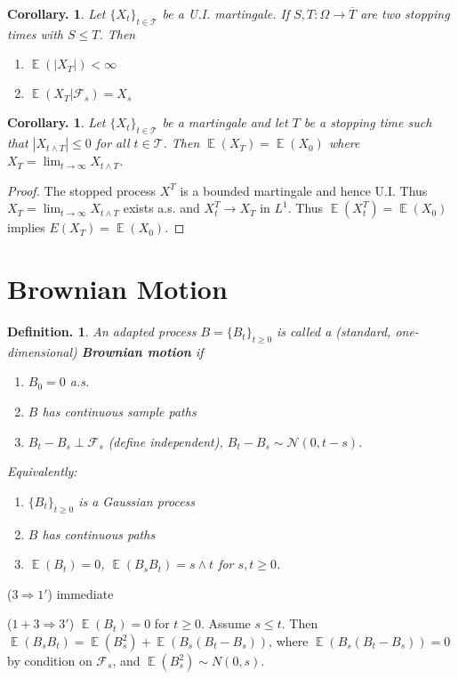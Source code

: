 \documentclass[11pt, a4paper]{memoir}
\newcommand{\imp}[2]{($#1\Rightarrow#2$)\hspace{0.2cm}}
\theoremstyle{change}
\newtheorem{corollary}[theorem]{Corollary.}
\theoremstyle{plain}
\theoremstyle{nonumberplain}
\newtheorem{definition}{Definition.}
\newtheorem{proof}{Proof}
\DeclareMathOperator{\E}{{\mathbb{E}}}
\newcommand{\defn}[1]{{\boldmath\bfseries #1}}
\numberwithin{equation}{section}
\begin{document}
\begin{corollary}
    Let $\{X_t\}_{t\in\mathcal{T}}$ be a U.I. martingale.
    If $S,T:\Omega\to\overline{T}$ are two stopping times with $S\leq T$.
    Then
    \begin{enumerate}[nl,r]
        \item $\E(|X_T|)<\infty$
        \item $\E(X_T|\mathcal{F}_s)=X_s$
    \end{enumerate}
\end{corollary}
\begin{corollary}
    Let $\{X_t\}_{t\in\mathcal{T}}$ be a martingale and let $T$ be a stopping time such that $|X_{t\wedge T}|\leq 0$ for all $t\in\mathcal{T}$.
    Then $\E(X_T)=\E(X_0)$ where $X_T=\lim_{t\to\infty}X_{t\wedge T}$.
\end{corollary}
\begin{proof}
    The stopped process $X^T$ is a bounded martingale and hence U.I.
    Thus $X_T=\lim_{t\to\infty}X_{t\wedge T}$ exists a.s. and $X_t^T\to X_T$ in $L^1$.
    Thus $\E(X^T_t)=\E(X_0)$ implies $E(X_T)=\E(X_0)$.
\end{proof}
\section{Brownian Motion}
\begin{definition}
    An adapted process $B=\{B_t\}_{t\geq 0}$ is called a (standard, one-dimensional) \defn{Brownian motion} if
    \begin{enumerate}[nl]
        \item $B_0=0$ a.s.
        \item $B$ has continuous sample paths
        \item $B_t-B_s\perp\mathcal{F}_s$ (define independent), $B_t-B_s\sim \mathcal{N}(0,t-s)$.
    \end{enumerate}
    Equivalently:
    \begin{enumerate}[nl]
        \item[1'] $\{B_t\}_{t\geq 0}$ is a Gaussian process
        \item[2'] $B$ has continuous paths
        \item[3'] $\E(B_t)=0$, $\E(B_sB_t)=s\wedge t$ for $s,t\geq 0$.
    \end{enumerate}
\end{definition}
\imp{3}{1'}
immediate

\imp{1+3}{3'}
$\E(B_t)=0$ for $t\geq 0$.
Assume $s\leq t$.
Then $\E(B_sB_t)=\E(B_s^2)+\E(B_s(B_t-B_s))$, where $\E(B_s(B_t-B_s))=0$ by condition on $\mathcal{F}_s$, and $\E(B_s^2)\sim N(0,s)$.
\end{document}
